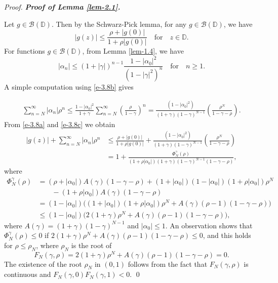 \documentclass[a4paper,12pt]{amsart}
\theoremstyle{plain}
\theoremstyle{definition}
\newenvironment{pf}[1][]{%
 \vskip 3mm
 \noindent
 \ifthenelse{\equal{#1}{}}%
  {{\slshape Proof. }}%
  {{\slshape #1.} }%
 }%
{\qed\bigskip}
\begin{document}
\begin{pf}[\bf Proof of Lemma \ref{lem-2.1}]
	Let $ g\in\mathcal{B}(\mathbb{D}) $. Then by the 
	Schwarz-Pick lemma, for any $ g\in\mathcal{B}(\mathbb{D}) $, we have
	\begin{equation}\label{e-3.8a}
		|g(z)|\leq \frac{\rho+|g(0)|}{1+\rho|g(0)|}\quad \mbox{for}\quad z\in\mathbb{D}.
	\end{equation}
	For functions $ g\in\mathcal{B}(\mathbb{D}) $, from Lemma \ref{lem-1.4}, we have
	\begin{equation}\label{e-3.8b}
		|\alpha_n|\leq (1+|\gamma|)^{n-1}\frac{1-|\alpha_0|^2}{(1-|\gamma|^2)^n}\quad\mbox{for}\quad n\geq 1.
	\end{equation}
	A simple computation using \eqref{e-3.8b} gives
	
	\begin{align}\label{e-3.8c}
		\sum_{n=N}^{\infty}|\alpha_n|\rho^n\leq \frac{1-|\alpha_0|^2}{1+\gamma}\sum_{n=N}^{\infty}\left(\frac{\rho}{1-\gamma}\right)^n=\frac{(1-|\alpha_0|^2)}{(1+\gamma)(1-\gamma)^{N-1}}\left(\frac{\rho^N}{1-\gamma-\rho}\right).
	\end{align}
	From \eqref{e-3.8a} and \eqref{e-3.8c} we obtain
	\begin{align*}
		|g(z)|+	\sum_{n=N}^{\infty}|\alpha_n|\rho^n&\leq \frac{\rho+|g(0)|}{1+\rho|g(0)|}+\frac{(1-|\alpha_0|^2)}{(1+\gamma)(1-\gamma)^{N-1}}\left(\frac{\rho^N}{1-\gamma-\rho}\right)\\&=1+\frac{\Phi^{\gamma}_N(\rho)}{(1+\rho|\alpha_0|)(1+\gamma)(1-\gamma)^{N-1}(1-\gamma-\rho)},
	\end{align*}
	where 
	\begin{align*}
		\Phi^{\gamma}_N(\rho)&=(\rho+|\alpha_0|)A(\gamma)(1-\gamma-\rho)+(1+|\alpha_0|)(1-|\alpha_0|)(1+\rho|\alpha_0|)\rho^N\\&\quad\quad-(1+\rho|\alpha_0|)A(\gamma)(1-\gamma-\rho)\\&=(1-|\alpha_0|)\bigg((1+|\alpha_0|)(1+\rho|\alpha_0|)\rho^N+A(\gamma)(\rho-1)(1-\gamma-\rho)\bigg)\\&\leq (1-|\alpha_0|)\bigg(2(1+\gamma)\rho^N+A(\gamma)(\rho-1)(1-\gamma-\rho)\bigg), 
	\end{align*}
	where  $ A(\gamma)=(1+\gamma)(1-\gamma)^{N-1} $ and $ |\alpha_0|\leq 1 $.
	\noindent An observation shows that $ \Phi^{\gamma}_N(\rho)\leq 0 $ if $ 2(1+\gamma)\rho^N+A(\gamma)(\rho-1)(1-\gamma-\rho)\leq 0 $, and this holds for $ \rho\leq \rho_N $, where $ \rho_N $ is the root of 
	\begin{equation*}
		F_N(\gamma,\rho)=2(1+\gamma)\rho^N+A(\gamma)(\rho-1)(1-\gamma-\rho)=0.
	\end{equation*}
	The existence of the root $ \rho_N $ in $ (0,1) $ follows from the fact that $ F_N(\gamma,\rho) $ is continuous and $ F_N(\gamma,0)F_N(\gamma,1)<0. $ 
\end{pf}
\end{document}
